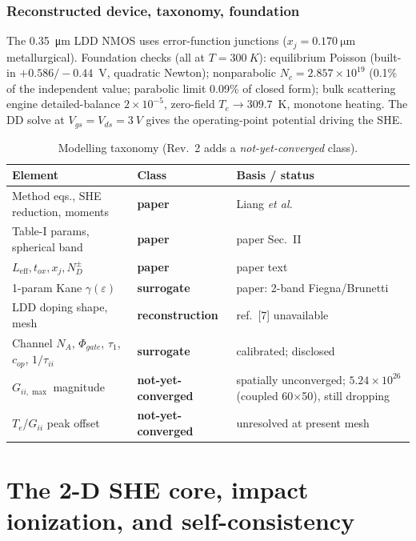 \documentclass[11pt]{article}
\newcommand{\eps}{\varepsilon}
\begin{document}
\section{Reconstructed device, taxonomy, foundation}\label{sec:device}
The \SI{0.35}{\micro\meter} LDD NMOS uses error-function junctions ($x_j=\SI{0.170}{\micro
\meter}$ metallurgical). Foundation checks (all at $T=\SI{300}{K}$): equilibrium Poisson (built-in
$+0.586/-0.44$~V, quadratic Newton); nonparabolic $N_c=2.857\times10^{19}$ (0.1\% of the
independent value; parabolic limit 0.09\% of closed form); bulk scattering engine
detailed-balance $2\times10^{-5}$, zero-field $T_e\to309.7$~K, monotone heating. The DD solve
at $V_{gs}=V_{ds}=\SI{3}{V}$ gives the operating-point potential driving the SHE.

\begin{table}[h]\centering\small
\caption{Modelling taxonomy (Rev.~2 adds a \emph{not-yet-converged} class).}\label{tab:taxonomy}
\begin{tabular}{p{5.4cm}p{3.0cm}p{5.8cm}}
\toprule
Element & Class & Basis / status \\
\midrule
Method eqs., SHE reduction, moments & \textbf{paper} & Liang \emph{et al.} \\
Table-I params, spherical band & \textbf{paper} & paper Sec.~II \\
$L_{\text{eff}},t_{ox},x_j,N_D^\pm$ & \textbf{paper} & paper text \\
1-param Kane $\gamma(\eps)$ & \textbf{surrogate} & paper: 2-band Fiegna/Brunetti \\
LDD doping shape, mesh & \textbf{reconstruction} & ref.~[7] unavailable \\
Channel $N_A$, $\Phi_{gate}$, $\tau_1$, $c_{op}$, $1/\tau_{ii}$ & \textbf{surrogate} & calibrated; disclosed \\
$G_{ii,\max}$ magnitude & \textbf{not-yet-converged} & spatially unconverged; $5.24\times10^{26}$ (coupled 60$\times$50), still dropping \\
$T_e$/$G_{ii}$ peak offset & \textbf{not-yet-converged} & unresolved at present mesh \\
\bottomrule
\end{tabular}
\end{table}

\part{The 2-D SHE core, impact ionization, and self-consistency}
\end{document}
